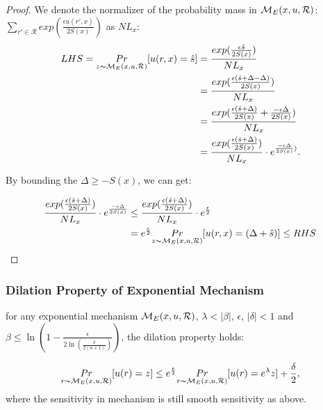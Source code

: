 \begin{proof}
We denote the normalizer of the probability mass in $\mathcal{M}_E(x, u, \mathcal{R})$: $\sum_{r' \in \mathcal{R}}exp(\frac{\epsilon u(r',x)}{2 S(x)})$ as $NL_x$:
\begin{equation*}
\begin{split}
LHS 
  = \underset{z \thicksim \mathcal{M}_E(x, u, \mathcal{R})}{Pr}[u(r,x) = \hat{s}]
& = \frac{exp(\frac{\epsilon \hat{s}}{2 S(x)})}{NL_x}\\
& = \frac{exp(\frac{\epsilon (\hat{s} + \Delta - \Delta)}{2 S(x)})}{NL_x}\\
& = \frac{exp(\frac{\epsilon (\hat{s} + \Delta)}{2 S(x)} + \frac{- \epsilon \Delta}{2 S(x)})}{NL_x}\\
& = \frac{exp(\frac{\epsilon (\hat{s} + \Delta)}{2 S(x)})}{NL_x} \cdot e^{\frac{- \epsilon \Delta}{2 S(x)})}.\\
\end{split}
\end{equation*}

By bounding the $\Delta \geq -S(x)$, we can get:

\begin{equation*}
\begin{split}
\frac{exp(\frac{\epsilon (\hat{s} + \Delta)}{2 S(x)})}{NL_x} \cdot e^{\frac{- \epsilon \Delta}{2 S(x)}}
& \leq \frac{exp(\frac{\epsilon (\hat{s} + \Delta)}{2 S(x)})}{NL_x} \cdot e^{\frac{\epsilon}{2}}\\
&  =  e^{\frac{\epsilon}{2}} \underset{z \thicksim \mathcal{M}_E(x, u, \mathcal{R})}{Pr}[u(r,x) = (\Delta + \hat{s})] \leq RHS\\
\end{split}
\end{equation*}

\end{proof}

\subsubsection{Dilation Property of Exponential Mechanism}
\begin{lem}
for any exponential mechanism $\mathcal{M}_E(x, u, \mathcal{R})$, $\lambda < |\beta|$, $\epsilon$, $|\delta| < 1$ and $\beta \leq \ln(1 - \frac{\epsilon}{2 \ln (\frac{\delta}{2 (n + 1)})})$, the dilation property holds:

\begin{equation*}
\underset{r \thicksim \mathcal{M}_E(x, u, \mathcal{R})}{Pr}[u(r) = z]
\leq
e^{\frac{\epsilon}{2}} \underset{r \thicksim \mathcal{M}_E(x, u, \mathcal{R})}{Pr}[u(r) = e^{\lambda} z] + \frac{\delta}{2},
\end{equation*}
where the sensitivity in mechanism is still smooth sensitivity as above.
\end{lem}

